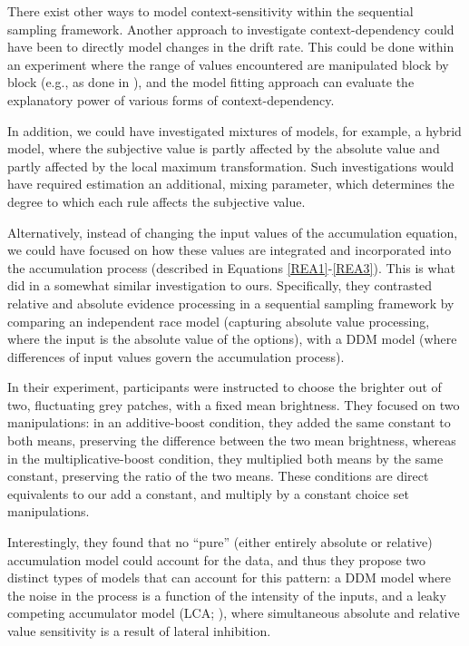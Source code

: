 \documentclass[11pt,a4paper]{article}
\begin{document}
There exist other ways to model context-sensitivity within the sequential sampling framework. Another approach to investigate context-dependency could have been to directly model changes in the drift rate. This could be done within an experiment where the range of values encountered are manipulated block by block (e.g., as done in ), and the model fitting approach can evaluate the explanatory power of various forms of context-dependency.

In addition, we could have investigated mixtures of models, for example, a hybrid model, where the subjective value is partly affected by the absolute value and partly affected by the local maximum transformation. Such investigations would have required estimation an additional, mixing parameter, which determines the degree to which each rule affects the subjective value.


 Alternatively, instead of changing the input values of the accumulation equation, we could have focused on how these values are integrated and incorporated into the accumulation process (described in Equations \ref{REA1}-\ref{REA3}). This is what  did in a somewhat similar investigation to ours. Specifically, they contrasted relative and absolute evidence processing in a sequential sampling framework by comparing an independent race model (capturing absolute value processing, where the input is the absolute value of the options), with a DDM model (where differences of input values govern the accumulation process).

In their experiment, participants were instructed to choose the brighter out of two, fluctuating grey patches, with a fixed mean brightness. They focused on two manipulations: in an additive-boost condition, they added the same constant to both means, preserving the difference between the two mean brightness, whereas in the multiplicative-boost condition, they multiplied both means by the same constant, preserving the ratio of the two means. These conditions are direct equivalents to our add a constant, and multiply by a constant choice set manipulations.

Interestingly, they found that no  ``pure'' (either entirely absolute or relative) accumulation model could account for the data, and thus they propose two distinct types  of models that can account for this pattern: a DDM model where the noise in the process is a function of the intensity of the inputs, and a leaky competing accumulator model (LCA; ), where simultaneous absolute and relative value sensitivity is a result of lateral inhibition. 
\end{document}
